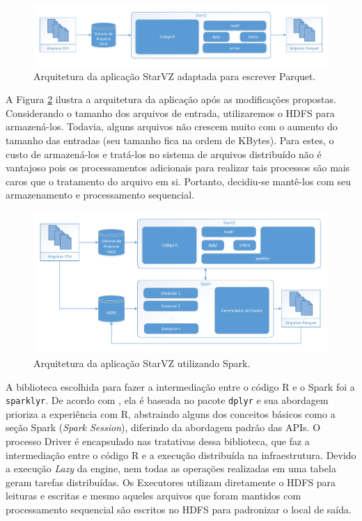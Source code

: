 \begin{figure}[ht]
 \centerline{\includegraphics[width=1\textwidth]{./img/starvz-arch-arrow.pdf}}
 \caption{Arquitetura da aplicação StarVZ adaptada para escrever Parquet.}
 \label{fig:starvz-app-arrow}
\end{figure}

A Figura \ref{fig:starvz-app-spark} ilustra a arquitetura da aplicação após as 
modificações propostas. Considerando o tamanho dos arquivos de entrada, 
utilizaremos o HDFS para armazená-los. Todavia, alguns arquivos não crescem 
muito com o aumento do tamanho das entradas (seu tamanho fica na ordem de 
KBytes). Para estes, o custo de armazená-los e tratá-los no 
sistema de arquivos distribuído não é vantajoso pois os processamentos 
adicionais para realizar tais processos são mais caros que o tratamento do 
arquivo em si. Portanto, decidiu-se mantê-los com seu armazenamento e 
processamento sequencial.

\begin{figure}[ht]
 \centerline{\includegraphics[width=1\textwidth]{./img/starvz-arch-spark.pdf}}
 \caption{Arquitetura da aplicação StarVZ utilizando Spark.}
 \label{fig:starvz-app-spark}
\end{figure}


A biblioteca escolhida para fazer a intermediação entre o código R e o Spark 
foi a \texttt{sparklyr}. De acordo com \citet{ref:sparkbook}, ela é 
baseada no pacote \texttt{dplyr} e sua abordagem prioriza a experiência com R, 
abstraindo alguns dos conceitos básicos como a seção Spark (\emph{Spark 
Session}), diferindo da abordagem padrão das APIs. O processo Driver é encapsulado
nas tratativas dessa biblioteca, que faz a intermediação entre o código R e a 
execução distribuída na infraestrutura. Devido a execução \emph{Lazy} da engine,
nem todas as operações realizadas em uma tabela geram tarefas distribuídas. Os
Executores utilizam diretamente o HDFS para leituras e escritas e mesmo aqueles
arquivos que foram mantidos com processamento sequencial são escritos no HDFS
para padronizar o local de saída.



